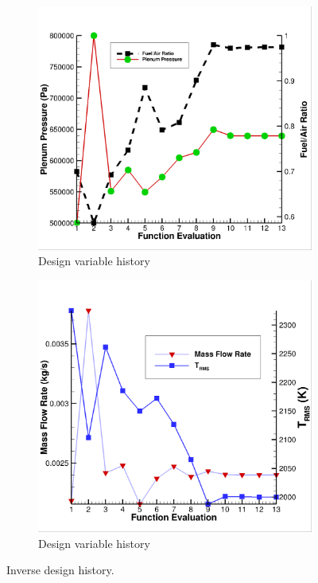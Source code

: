 \begin{figure}[h]
  \centering
  \begin{subfigure}[b]{0.45\textwidth}
    \includegraphics[width=\textwidth]{figures/1st-H2/dv_hist.png}
    \caption{Design variable history}
    \label{fig:dv-hist-1st-H2}
  \end{subfigure}
  \begin{subfigure}[b]{0.45\textwidth}
    \includegraphics[width=\textwidth]{figures/1st-H2/fm_hist.png}
    \caption{Design variable history}
    \label{fig:fm-hist-1st-H2}
  \end{subfigure}
  \caption{Inverse design history.}
\end{figure}
